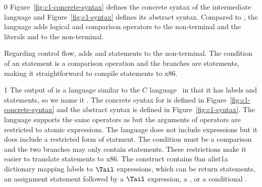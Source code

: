 \documentclass[7x10]{TimesAPriori_MIT}%
\def\racketEd{0}
\def\pythonEd{1}
\def\edition{1}
\newcommand{\racket}[1]{{\if\edition\racketEd{#1}\fi}}
\newcommand{\python}[1]{{\if\edition\pythonEd #1\fi}}
\begin{document}
{\if\edition\racketEd
%
Figure~\ref{fig:c1-concrete-syntax} defines the concrete syntax of the
\LangCIf{} intermediate language and Figure~\ref{fig:c1-syntax}
defines its abstract syntax. Compared to \LangCVar{}, the \LangCIf{}
language adds logical and comparison operators to the \Exp{}
non-terminal and the literals \TRUE{} and \FALSE{} to the \Arg{}
non-terminal.

Regarding control flow, \LangCIf{} adds  and 
statements to the \Tail{} non-terminal. The condition of an 
statement is a comparison operation and the branches are 
statements, making it straightforward to compile  statements
to x86.
%
\fi}
%
{\if\edition\pythonEd
%
The output of  is a language similar to the
$C$ language~\citep{Kernighan:1988nx} in that it has labels and
 statements, so we name it \LangCIf{}.  The
concrete syntax for \LangCIf{} is defined in
Figure~\ref{fig:c1-concrete-syntax}
and the abstract syntax is defined in Figure~\ref{fig:c1-syntax}.
%
The \LangCIf{} language supports the same operators as \LangIf{} but
the arguments of operators are restricted to atomic expressions. The
\LangCIf{} language does not include  expressions but it does
include a restricted form of  statment. The condition must be
a comparison and the two branches may only contain 
statements. These restrictions make it easier to translate 
statements to x86.
%
\fi}
%
The  construct contains
%
\racket{an alist}\python{a dictionary}
%
mapping labels to $\Tail$ expressions, which can be return statements,
an assignment statement followed by a $\Tail$ expression, a
, or a conditional .

\newcommand{\CifGrammarRacket}{
\begin{array}{lcl}
\Atm &::=& \itm{bool} \\
\itm{cmp} &::= & \code{eq?} \MID \code{<} \MID \code{<=} \MID \code{>} \MID \code{>=} \\
\Exp &::=& \CNOT{\Atm} \MID \LP \itm{cmp}~\Atm~\Atm\RP \\
\Tail &::= & \key{goto}~\itm{label}\key{;}\\
   &\MID& \key{if}~\LP \itm{cmp}~\Atm~\Atm \RP~ \key{goto}~\itm{label}\key{;} ~\key{else}~\key{goto}~\itm{label}\key{;} 
\end{array}
}

\newcommand{\CifASTRacket}{
\begin{array}{lcl}
\Atm &::=& \BOOL{\itm{bool}} \\
\itm{cmp} &::= & \code{eq?} \MID \code{<} \MID \code{<=} \MID \code{>} \MID \code{>=} \\
\Exp &::= & \UNIOP{\key{'not}}{\Atm} \MID \BINOP{\key{'}\itm{cmp}}{\Atm}{\Atm} \\
\Tail &::= & \GOTO{\itm{label}} \\
    &\MID& \IFSTMT{\BINOP{\itm{cmp}}{\Atm}{\Atm}}{\GOTO{\itm{label}}}{\GOTO{\itm{label}}} 
\end{array}
}
\end{document}
